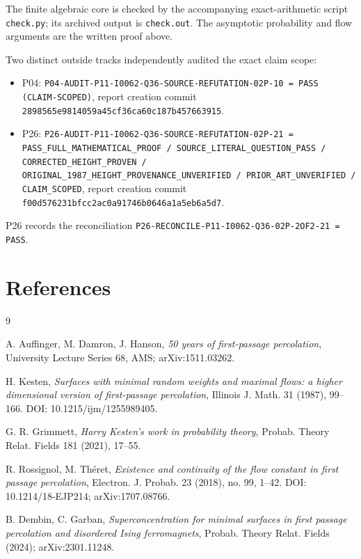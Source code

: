 \documentclass[11pt]{article}
\begin{document}
The finite algebraic core is checked by the accompanying exact-arithmetic script \texttt{check.py}; its archived output is \texttt{check.out}.  The asymptotic probability and flow arguments are the written proof above.

Two distinct outside tracks independently audited the exact claim scope:
\begin{itemize}
\item P04: \texttt{P04-AUDIT-P11-I0062-Q36-SOURCE-REFUTATION-02P-10 = PASS (CLAIM-SCOPED)}, report creation commit \texttt{2898565e9814059a45cf36ca60c187b457663915}.
\item P26: \texttt{P26-AUDIT-P11-I0062-Q36-SOURCE-REFUTATION-02P-21 = PASS\_FULL\_MATHEMATICAL\_PROOF / SOURCE\_LITERAL\_QUESTION\_PASS / CORRECTED\_HEIGHT\_PROVEN / ORIGINAL\_1987\_HEIGHT\_PROVENANCE\_UNVERIFIED / PRIOR\_ART\_UNVERIFIED / CLAIM\_SCOPED}, report creation commit \texttt{f00d576231bfcc2ac0a91746b0646a1a5eb6a5d7}.
\end{itemize}
P26 records the reconciliation \texttt{P26-RECONCILE-P11-I0062-Q36-02P-2OF2-21 = PASS}.

\section{References}

\begin{thebibliography}{9}

A. Auffinger, M. Damron, J. Hanson,
\emph{50 years of first-passage percolation},
University Lecture Series 68, AMS; arXiv:1511.03262.

H. Kesten,
\emph{Surfaces with minimal random weights and maximal flows: a higher dimensional version of first-passage percolation},
Illinois J. Math. 31 (1987), 99--166.
DOI: 10.1215/ijm/1255989405.

G. R. Grimmett,
\emph{Harry Kesten's work in probability theory},
Probab. Theory Relat. Fields 181 (2021), 17--55.

R. Rossignol, M. Th\'eret,
\emph{Existence and continuity of the flow constant in first passage percolation},
Electron. J. Probab. 23 (2018), no. 99, 1--42.
DOI: 10.1214/18-EJP214; arXiv:1707.08766.

B. Dembin, C. Garban,
\emph{Superconcentration for minimal surfaces in first passage percolation and disordered Ising ferromagnets},
Probab. Theory Relat. Fields (2024); arXiv:2301.11248.

\end{thebibliography}
\end{document}

